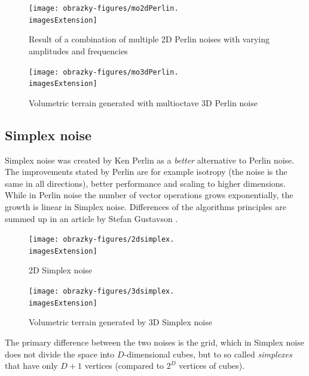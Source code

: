 \begin{figure}[H]
	\centering
	\begin{minipage}[t]{0.48\textwidth}
		\centering
		\texttt{[image: obrazky-figures/mo2dPerlin.\\imagesExtension]}
		\caption{Result of a combination of multiple 2D Perlin noises with varying amplitudes and frequencies}
	\end{minipage}
	\hfill
	\begin{minipage}[t]{0.48\textwidth}
		\centering
		\texttt{[image: obrazky-figures/mo3dPerlin.\\imagesExtension]}
		\caption{Volumetric terrain generated with multioctave 3D Perlin noise}
	\end{minipage}
\end{figure}

\subsection{Simplex noise}
Simplex noise was created by Ken Perlin \cite{Perlin2002} as a \textit{better} alternative to Perlin noise. The improvements stated by Perlin are for example isotropy (the noise is the same in all directions), better performance and scaling to higher dimensions. While in Perlin noise the number of vector operations grows exponentially, the growth is linear in Simplex noise. Differences of the algorithms principles are summed up in an article by Stefan Gustavson \cite{Gustavson2005}.

\begin{figure}[H]
	\centering
	\begin{minipage}[t]{0.48\textwidth}
		\centering
		\texttt{[image: obrazky-figures/2dsimplex.\\imagesExtension]}
		\caption{2D Simplex noise}
	\end{minipage}
	\hfill
	\begin{minipage}[t]{0.48\textwidth}
		\centering
		\texttt{[image: obrazky-figures/3dsimplex.\\imagesExtension]}
		\caption{Volumetric terrain generated by 3D Simplex noise}
	\end{minipage}
\end{figure}

The primary difference between the two noises is the grid, which in Simplex noise does not divide the space into $D$-dimensional cubes, but to so called \textit{simplexes} that have only $D+1$ vertices (compared to $2^D$ vertices of cubes).


